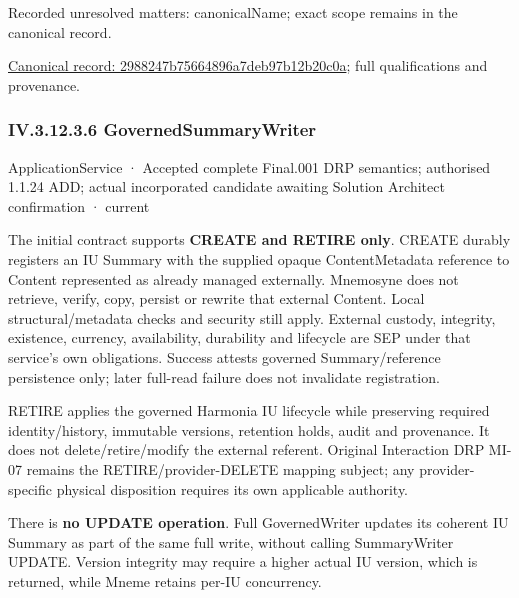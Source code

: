 {\small Recorded unresolved matters: canonicalName; exact scope remains in the canonical record.}\par
{\footnotesize \href{../../../../../../../continuum/application/application-service/2988247b75664896a7deb97b12b20c0a.md}{Canonical record: 2988247b75664896a7deb97b12b20c0a}; full qualifications and provenance.}\par
\subsubsection*{IV.3.12.3.6 GovernedSummaryWriter}
\label{navigation:IV.3.12.3.6}

\label{element:bffb611e29844eedaf39a5b27ccbbcc7}
{\small ApplicationService · Accepted complete Final.001 DRP semantics; authorised 1.1.24 ADD; actual incorporated candidate awaiting Solution Architect confirmation · current}\par

The initial contract supports \textbf{CREATE and RETIRE only}. CREATE durably registers an IU Summary with the supplied opaque ContentMetadata reference to Content represented as already managed externally. Mnemosyne does not retrieve, verify, copy, persist or rewrite that external Content. Local structural/metadata checks and security still apply. External custody, integrity, existence, currency, availability, durability and lifecycle are SEP under that service's own obligations. Success attests governed Summary/reference persistence only; later full-read failure does not invalidate registration.



RETIRE applies the governed Harmonia IU lifecycle while preserving required identity/history, immutable versions, retention holds, audit and provenance. It does not delete/retire/modify the external referent. Original Interaction DRP MI-07 remains the RETIRE/provider-DELETE mapping subject; any provider-specific physical disposition requires its own applicable authority.



There is \textbf{no UPDATE operation}. Full GovernedWriter updates its coherent IU Summary as part of the same full write, without calling SummaryWriter UPDATE. Version integrity may require a higher actual IU version, which is returned, while Mneme retains per-IU concurrency.



